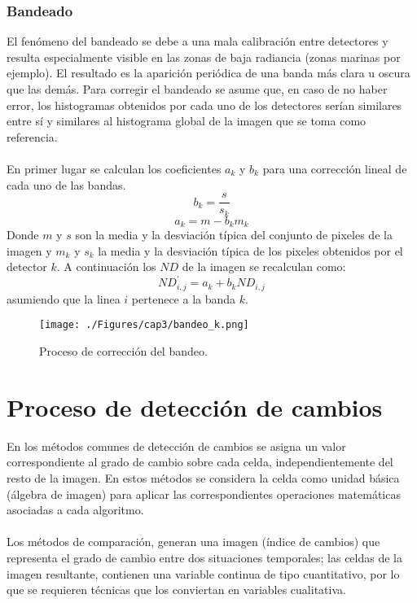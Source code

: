 \subsubsection{Bandeado}
El fen\'omeno del bandeado se debe a una mala calibraci\'on entre detectores y resulta especialmente visible en las zonas de baja radiancia (zonas marinas por ejemplo). El resultado es la aparici\'on peri\'odica de una banda m\'as clara u oscura que las dem\'as.
Para corregir el bandeado se asume que, en caso de no haber error, los histogramas obtenidos por cada uno de los detectores ser\'ian similares entre s\'i y similares al histograma global de la imagen que se toma como referencia.\\~\\
En primer lugar se calculan los coeficientes $ a_{k} $ y $ b_{k} $ para una correcci\'on lineal de cada uno de las bandas.
		\begin{equation}
		b_{k}=\dfrac{s}{s_{k}}
		\end{equation} 	
				\begin{equation}
				a_{k}=m - b_{k}m_{k}
				\end{equation} 	
Donde $ m $ y $ s $ son la media y la desviaci\'on t\'ipica del conjunto de pixeles de la imagen y $ m_{k} $ y $ s_{k} $ la media
y la desviaci\'on t\'ipica de los pixeles obtenidos por el detector $ k $. A continuaci\'on los $ ND $ de la imagen se recalculan como:
				\begin{equation}
				ND_{i,j}^{'} = a_{k}+b_{k}ND_{i,j}
				\end{equation} 	
asumiendo que la linea $ i $ pertenece a la banda $ k $.				

    \begin{figure}[H]
    	\centering
    	\texttt{[image: ./Figures/cap3/bandeo\_k.png]}
    	\caption{Proceso de correcci\'on del bandeo.}
    	\label{fig:bandeado}
    \end{figure}

\section{Proceso de detecci\'on de cambios}
En los m\'etodos comunes de detecci\'on de cambios se asigna un valor correspondiente al grado de cambio sobre cada celda, independientemente del resto de la imagen. En estos m\'etodos se considera la celda como unidad b\'asica (\'algebra de imagen) para aplicar las correspondientes operaciones matem\'aticas asociadas a cada algoritmo.\\~\\
Los m\'etodos de comparaci\'on, generan una imagen (\'indice de cambios) que representa el grado de cambio entre dos situaciones temporales; las celdas de la imagen resultante, contienen una variable continua de tipo cuantitativo, por lo que se requieren t\'ecnicas que los conviertan en variables cualitativa\cite{martinez2013normalizacion}.
